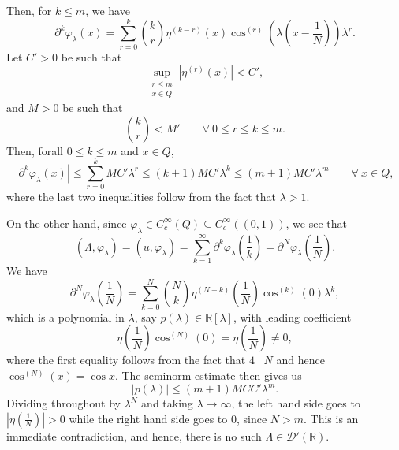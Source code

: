 \documentclass[10pt]{amsart}
\theoremstyle{thmstyle}
\theoremstyle{defstyle}
\newcommand{\R}{\mathbb{R}}
\renewcommand{\le}{\leqslant}
\begin{document}
Then, for $k\le m$, we have 
\begin{equation*}
	\partial^k\varphi_\lambda(x) = \sum_{r = 0}^k\binom{k}{r}\eta^{(k - r)}(x)\cos^{(r)}\left(\lambda\left(x - \frac{1}{N}\right)\right)\lambda^r.
\end{equation*}
Let $C' > 0$ be such that 
\begin{equation*}
	\sup_{\substack{r\le m\\ x\in Q}}|\eta^{(r)}(x)| < C',
\end{equation*}
and $M > 0$ be such that 
\begin{equation*}
	\binom{k}{r} < M'\qquad\forall~0\le r\le k\le m.
\end{equation*}
Then, forall $0\le k\le m$ and $x\in Q$,
\begin{equation*}
	|\partial^k\varphi_\lambda(x)|\le\sum_{r = 0}^k MC'\lambda^r\le (k + 1)MC'\lambda^k\le (m + 1)MC'\lambda^m\qquad\forall~x\in Q,
\end{equation*}
where the last two inequalities follow from the fact that $\lambda > 1$. 

On the other hand, since $\varphi_\lambda\in C_c^\infty(Q)\subseteq C_c^\infty((0, 1))$, we see that 
\begin{equation*}
	(\Lambda,\varphi_\lambda) = (u,\varphi_\lambda) = \sum_{k = 1}^\infty\partial^k\varphi_\lambda\left(\frac{1}{k}\right) = \partial^N\varphi_\lambda\left(\frac{1}{N}\right).
\end{equation*}
We have 
\begin{equation*}
	\partial^N\varphi_\lambda\left(\frac{1}{N}\right) = \sum_{k = 0}^N\binom{N}{k}\eta^{(N - k)}\left(\frac{1}{N}\right)\cos^{(k)}(0)\lambda^k,
\end{equation*}
which is a polynomial in $\lambda$, say $p(\lambda)\in\R[\lambda]$, with leading coefficient 
\begin{equation*}
	\eta\left(\frac{1}{N}\right)\cos^{(N)}(0) = \eta\left(\frac{1}{N}\right)\ne 0,
\end{equation*}
where the first equality follows from the fact that $4\mid N$ and hence $\cos^{(N)}(x) = \cos x$. The seminorm estimate then gives us 
\begin{equation*}
	|p(\lambda)|\le(m + 1)MCC'\lambda^m.
\end{equation*}
Dividing throughout by $\lambda^N$ and taking $\lambda\to\infty$, the left hand side goes to $|\eta\left(\frac{1}{N}\right)| > 0$ while the right hand side goes to $0$, since $N > m$. This is an immediate contradiction, and hence, there is no such $\Lambda\in\mathscr D'(\R)$.
\end{document}
